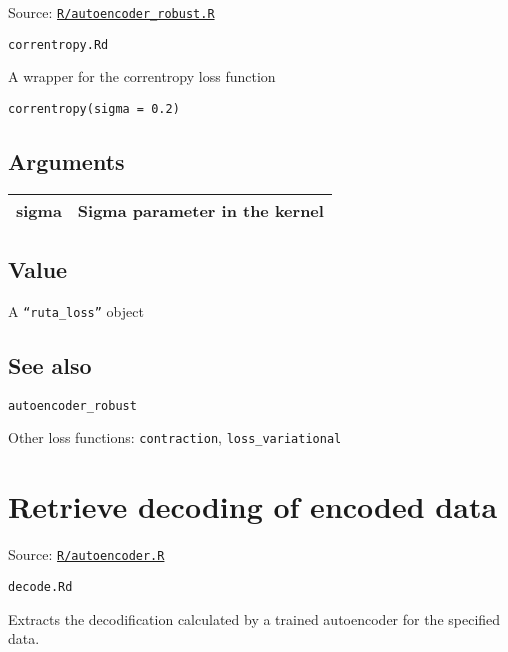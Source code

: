 Source:
\href{https://github.com/fdavidcl/ruta/blob/master/R/autoencoder_robust.R}{\texttt{R/autoencoder\_robust.R}}

\texttt{correntropy.Rd}

A wrapper for the correntropy loss function

\begin{verbatim}
correntropy(sigma = 0.2)
\end{verbatim}

\hypertarget{arguments}{\subsection{\texorpdfstring{\protect\hyperlink{arguments}{}Arguments}{Arguments}}\label{arguments}}

\begin{longtable}[c]{@{}>{\small}p{3cm}>{\raggedright}p{12.5cm}@{}}
\toprule
sigma & Sigma parameter in the kernel\tabularnewline
\bottomrule
\end{longtable}

\hypertarget{value}{\subsection{\texorpdfstring{\protect\hyperlink{value}{}Value}{Value}}\label{value}}

A \texttt{``ruta\_loss''} object

\hypertarget{see-also}{\subsection{\texorpdfstring{\protect\hyperlink{see-also}{}See
also}{See also}}\label{see-also}}

\texttt{autoencoder\_robust}

Other loss functions: \texttt{contraction}, \texttt{loss\_variational}

\section{Retrieve decoding of encoded
data}\label{retrieve-decoding-of-encoded-data}

Source:
\href{https://github.com/fdavidcl/ruta/blob/master/R/autoencoder.R}{\texttt{R/autoencoder.R}}

\texttt{decode.Rd}

Extracts the decodification calculated by a trained autoencoder for the
specified data.

